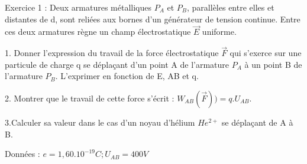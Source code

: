 \documentclass[12pt, french]{article}
\begin{document}
\begin{center}
\end{center}


   \begin{Box2}{Exercice 1 : }
Deux armatures métalliques $P_A$ et $P_B$, parallèles entre elles et distantes de d, sont reliées aux bornes d'un
générateur de tension continue. Entre ces deux armatures règne un champ électrostatique $\vec{E}$ uniforme.

1. Donner l'expression du travail de la force électrostatique $\vec{F}$ qui s'exerce sur une particule de charge q se
déplaçant d'un point A de l'armature $P_A$ à un point B de l'armature $P_B$. L'exprimer en fonction de E, AB et q.

      2. Montrer que le travail de cette force s'écrit : $W_{AB}(\vec{F})) = q.U_{AB}$.

      3.Calculer sa valeur dans le cas d'un noyau d'hélium $He^{2+}$ se déplaçant de A à B.

      Données : $e = 1,60 . 10^{-19}C; U_{AB}= 400 V$
   \end{Box2}
\end{document}
